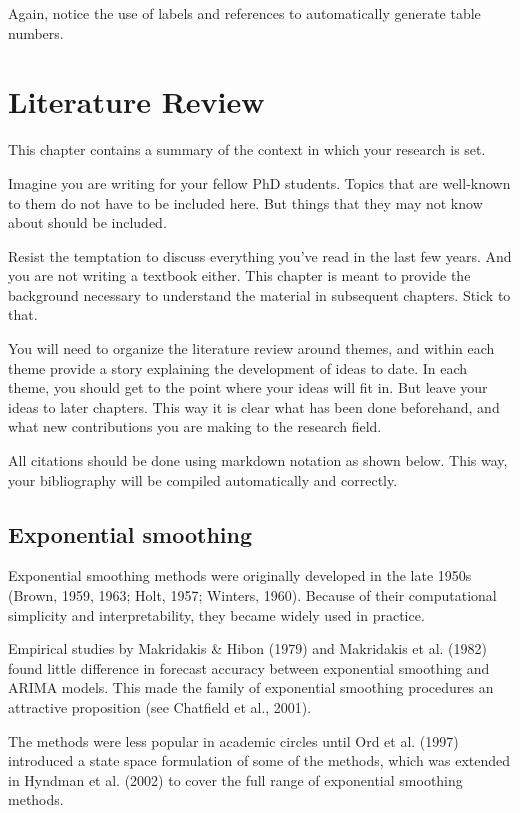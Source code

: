 \documentclass{uniexeterthesis}
\begin{document}
Again, notice the use of labels and references to automatically generate
table numbers.


\hypertarget{sec-methodology}{%
\chapter{Literature Review}\label{sec-methodology}}

This chapter contains a summary of the context in which your research is
set.

Imagine you are writing for your fellow PhD students. Topics that are
well-known to them do not have to be included here. But things that they
may not know about should be included.

Resist the temptation to discuss everything you've read in the last few
years. And you are not writing a textbook either. This chapter is meant
to provide the background necessary to understand the material in
subsequent chapters. Stick to that.

You will need to organize the literature review around themes, and
within each theme provide a story explaining the development of ideas to
date. In each theme, you should get to the point where your ideas will
fit in. But leave your ideas to later chapters. This way it is clear
what has been done beforehand, and what new contributions you are making
to the research field.

All citations should be done using markdown notation as shown below.
This way, your bibliography will be compiled automatically and
correctly.

\hypertarget{sec-expsmooth}{%
\section{Exponential smoothing}\label{sec-expsmooth}}

Exponential smoothing methods were originally developed in the late
1950s (Brown, 1959, 1963; Holt, 1957; Winters, 1960). Because of their
computational simplicity and interpretability, they became widely used
in practice.

Empirical studies by Makridakis \& Hibon (1979) and Makridakis et al.
(1982) found little difference in forecast accuracy between exponential
smoothing and ARIMA models. This made the family of exponential
smoothing procedures an attractive proposition (see Chatfield et al.,
2001).

The methods were less popular in academic circles until Ord et al.
(1997) introduced a state space formulation of some of the methods,
which was extended in Hyndman et al. (2002) to cover the full range of
exponential smoothing methods.
\end{document}
